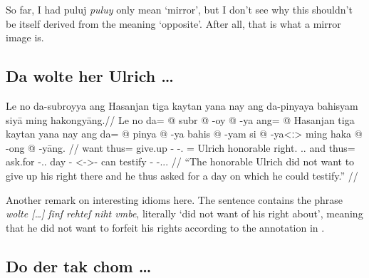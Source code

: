 \documentclass[12pt,paper=a4]{scrartcl}
\newcommand{\fw}[1]{\textit{#1}} %
\newcommand{\ayr}[1]{{\Tagati #1}}
\begin{document}
So far, I had \ayr{puluj} \fw{puluy} only mean `mirror', but I don't see why 
this shouldn't be itself derived from the meaning `opposite'. After all, that is 
what a mirror image is.

\subsection*{Da wolte her Ulrich …}


\ex \begingl
	\glpreamble Le no da-subroyya ang Hasanjan tiga kaytan yana nay 
		ang da-pinyaya bahisyam siyā ming ha\-kong\-yāng.//
	\gla Le no da= @ subr @ -oy @ -ya ang= @ Hasanjan tiga kaytan yana 
		nay ang da= @ pinya @ -ya bahis @ -yam si @ -ya<ː> ming haka 
		@ -ong @ -yāng. //
	\glb \PatT{} want thus= give.up -\Neg{} -\Tsg{}.\M{} \Aarg{}= Ulrich 
		honorable right.\Top{} \Tsg{}.\M{}.\Gen{} and \AgtT{} thus= 
		ask.for -\Tsg{}.\M{}.\Top{} day -\Dat{} \Rel{} <-\Dat{}>-\Loc{} 
		can testify -\Irr{} -\Tsg{}.\M{}.\Aarg{}. //
	\glft \enquote{The honorable Ulrich did not want to give up his right 
		there and he thus asked for a day on which he could testify.} //
\endgl \xe

Another remark on interesting idioms here. The \Mhg{} sentence contains the 
phrase \fw{wolte […] ſinſ rehteſ niht vmbe}, literally `did not want of his 
right about', meaning that he did not want to forfeit his rights according to 
the annotation in \textcite{n163-online}.

\subsection*{Do der tak chom …}

\end{document}
